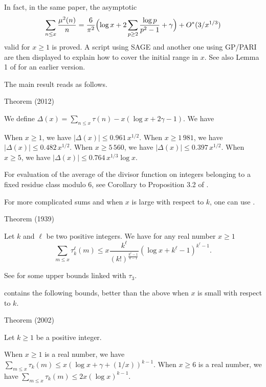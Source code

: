 In fact, in the same paper, the asymptotic
$$
\sum_{n\le x}\frac{\mu^2(n)}{n}
=\frac{6}{\pi^2}\Bigl(\log x+2\sum_{p\ge2}\frac{\log
p}{p^2-1}+\gamma\Bigr)
+O^*(3/x^{1/3})
$$
valid for $x\ge1$ is proved. A script using SAGE and another one using GP/PARI are then
displayed to explain how to cover the initial range in $x$.
See also Lemma 1
of \cite{Schoenfeld*69} for an
earlier version.




The main result
\cite{Berkane-Bordelles-Ramare*11}
reads as follows.

\begin{thm}{Theorem (2012)}

We define $\Delta(x)=\sum_{n\le x}\tau(n)-x(\log x+2\gamma-1)$. We have

 When $x\ge 1$, we have $|\Delta(x)|\le 0.961\, {x^{1/2}}$.
 When $x\ge 1\,981$, we have $|\Delta(x)|\le 0.482\, {x^{1/2}}$.
 When $x\ge 5\,560$, we have $|\Delta(x)|\le 0.397\, {x^{1/2}}$.
 When $x\ge 5$, we have $|\Delta(x)|\le 0.764\, {x^{1/3}\log x}$.

\end{thm}


For evaluation of the average of the divisor function on integers belonging to
a fixed residue class modulo 6, see Corollary to Proposition 3.2 of 
\cite{Deshouillers-Dress*88}.



For more complicated sums and when $x$ is large with respect to $k$, one can use
\cite{Mardjanichvili*39}.

\begin{thm}{Theorem (1939)}

  Let $k$ and $\ell$ be two positive integers. We have for any real number
$x\ge1$ 
$$
 \sum_{m\le x}\tau_k^\ell(m) \le
x\frac{k^\ell}{(k!)^{\frac{k^\ell-1}{k-1}}}(\log x+k^\ell-1)^{k^\ell-1}.  
$$
\end{thm}

See \cite{Deshouillers-Dress*88}
for some upper bounds linked with $\tau_3$.


\cite{Bordelles*02}
contains the following bounds, better than the above when $x$ is small with
respect to $k$.

\begin{thm}{Theorem (2002)}

  Let $k\ge1$ be a positive integer.

 When  $x\ge1$ is a real number, we have
  $\sum_{m\le x}\tau_k(m)\le x(\log x+\gamma+(1/x))^{k-1}$.
 When $x\ge6$ is a real number, we have
  $\sum_{m\le x}\tau_k(m)\le 2x(\log x)^{k-1}$.

\end{thm}


